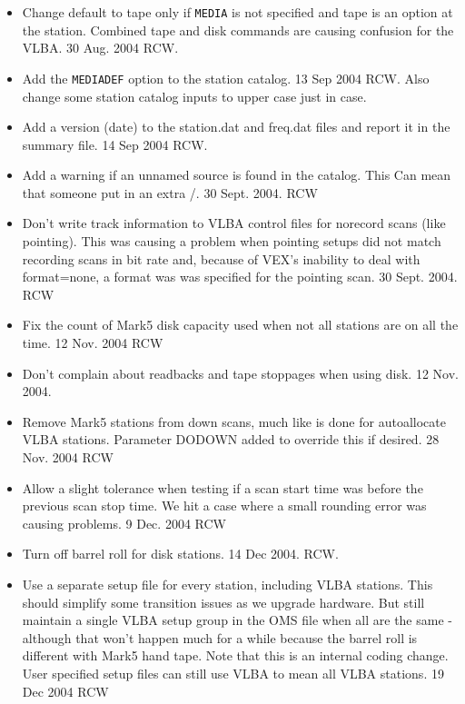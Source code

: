 \documentclass{report}
\begin{document}
\begin{itemize}
\item Change default to tape only if {\tt MEDIA} is not specified and
tape is an option at the station.  Combined tape and disk commands
are causing confusion for the VLBA.  30 Aug. 2004  RCW.

\item Add the {\tt MEDIADEF} option to the station catalog.  13 Sep 2004
RCW.  Also change some station catalog inputs to upper case just in case.

\item Add a version (date) to the station.dat and freq.dat files and
report it in the summary file.  14 Sep 2004 RCW.

\item Add a warning if an unnamed source is found in the catalog.  This
Can mean that someone put in an extra /.  30 Sept. 2004. RCW

\item Don't write track information to VLBA control files for norecord
scans (like pointing).  This was causing a problem when pointing setups
did not match recording scans in bit rate and, because of VEX's
inability to deal with format=none, a format was was specified for the
pointing scan.  30 Sept. 2004. RCW

\item Fix the count of Mark5 disk capacity used when not all stations
are on all the time.  12 Nov. 2004 RCW

\item Don't complain about readbacks and tape stoppages when using disk.
12 Nov. 2004.

\item Remove Mark5 stations from down scans, much like is done for
autoallocate VLBA stations.  Parameter DODOWN added to override this
if desired.  28 Nov. 2004  RCW

\item Allow a slight tolerance when testing if a scan start time was
before the previous scan stop time.  We hit a case where a small rounding
error was causing problems.  9 Dec. 2004  RCW

\item Turn off barrel roll for disk stations.  14 Dec 2004. RCW.

\item Use a separate setup file for every station, including VLBA stations.
This should simplify some transition issues as we upgrade hardware.  But
still maintain a single VLBA setup group in the OMS file when all are the
same - although that won't happen much for a while because the barrel roll
is different with Mark5 hand tape.  Note that this is an internal coding
change. User specified setup files can still use VLBA to mean all VLBA
stations.  19 Dec 2004  RCW


\end{itemize}
\end{document}
